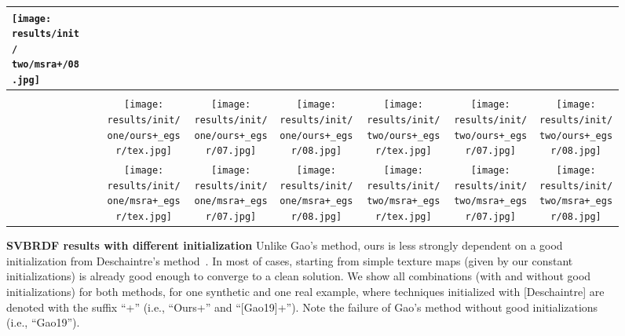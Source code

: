 \begin{figure*}[tbhp]
\begin{tabular}{lcccc@{\hspace{2\tabcolsep}}ccc}
		\texttt{[image: results/init/\\two/msra+/08.jpg]}
		\\
		\hline\\[-8pt]
		\multirow{2}{*}[3.15em]{\rotatebox{90}{\footnotesize\bfseries [Deschaintre]-based init.}} &
		\raisebox{.25in}{\rotatebox[origin=c]{90}{\footnotesize{Ours+}}} &
		\texttt{[image: results/init/\\one/ours+\_egsr/tex.jpg]} &
		\texttt{[image: results/init/\\one/ours+\_egsr/07.jpg]} &
		\texttt{[image: results/init/\\one/ours+\_egsr/08.jpg]} &
		\texttt{[image: results/init/\\two/ours+\_egsr/tex.jpg]} &
		\texttt{[image: results/init/\\two/ours+\_egsr/07.jpg]} &
		\texttt{[image: results/init/\\two/ours+\_egsr/08.jpg]}
		\\
		& \raisebox{.25in}{\rotatebox[origin=c]{90}{\footnotesize{[Gao19]+}}} &
		\texttt{[image: results/init/\\one/msra+\_egsr/tex.jpg]} &
		\texttt{[image: results/init/\\one/msra+\_egsr/07.jpg]} &
		\texttt{[image: results/init/\\one/msra+\_egsr/08.jpg]} &
		\texttt{[image: results/init/\\two/msra+\_egsr/tex.jpg]} &
		\texttt{[image: results/init/\\two/msra+\_egsr/07.jpg]} &
		\texttt{[image: results/init/\\two/msra+\_egsr/08.jpg]}
		\\
	\end{tabular}
	\caption{\label{fig:result_init}
		\textbf{SVBRDF results with different initialization} Unlike Gao's method, ours is less strongly dependent on a good initialization from Deschaintre's method~. In most of cases, starting from simple texture maps (given by our constant initializations) is already good enough to converge to a clean solution. We show all combinations (with and without good initializations) for both methods, for one synthetic and one real example, where techniques initialized with [Deschaintre] are denoted with the suffix ``+'' (i.e., ``Ours+'' and ``[Gao19]+''). Note the failure of Gao's method without good initializations (i.e., ``Gao19'').}
\end{figure*}

